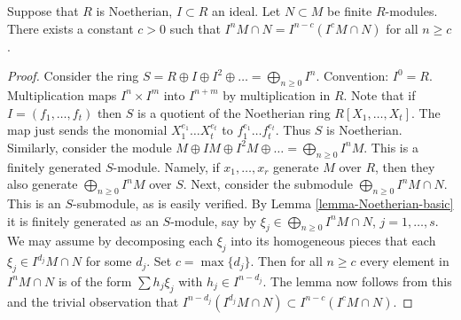 \begin{lemma}
\label{lemma-Artin-Rees}
Suppose that $R$ is Noetherian, $I \subset R$ an ideal.
Let $N \subset M$ be finite $R$-modules.
There exists a constant $c > 0$ such that
$I^n M \cap N  =  I^{n-c}(I^cM \cap N)$ for all $n \geq c$.
\end{lemma}

\begin{proof}
Consider the ring $S = R \oplus I \oplus I^2 \oplus \ldots
= \bigoplus_{n \geq 0} I^n$. Convention: $I^0 = R$.
Multiplication maps $I^n \times I^m$
into $I^{n + m}$ by multiplication in $R$.
Note that if $I = (f_1, \ldots, f_t)$
then $S$ is a quotient of the Noetherian ring $R[X_1, \ldots, X_t]$.
The map just sends the monomial $X_1^{e_1}\ldots X_t^{e_t}$
to $f_1^{e_1}\ldots f_t^{e_t}$. Thus $S$ is Noetherian.
Similarly, consider the module $M \oplus IM \oplus I^2M \oplus \ldots
= \bigoplus_{n \geq 0} I^nM$. This is a finitely generated $S$-module.
Namely, if $x_1, \ldots, x_r$ generate $M$ over $R$, then they also generate
$\bigoplus_{n \geq 0} I^nM$ over $S$. Next, consider the
submodule $\bigoplus_{n \geq 0} I^nM \cap N$.
This is an $S$-submodule, as is easily verified. By
Lemma \ref{lemma-Noetherian-basic} it is finitely generated as
an $S$-module,
say by $\xi_j \in \bigoplus_{n \geq 0} I^nM \cap N$, $j = 1, \ldots, s$.
We may assume by decomposing each $\xi_j$ into its homogeneous
pieces that each $\xi_j \in I^{d_j}M \cap N$ for some $d_j$.
Set $c = \max\{d_j\}$. Then for all $n \geq c$ every element
in $I^nM \cap N$ is of the form $\sum h_j \xi_j$ with
$h_j \in I^{n - d_j}$. The lemma now follows from this and the trivial
observation that $I^{n-d_j}(I^{d_j}M \cap N) \subset I^{n-c}(I^cM \cap N)$.
\end{proof}